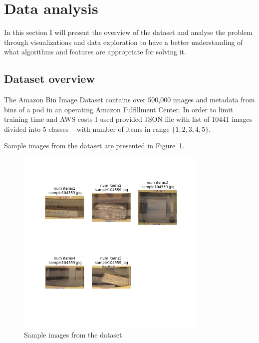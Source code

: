 \documentclass{article}
\begin{document}
\section{Data analysis}
In this section I will present the overview of the dataset and analyse the problem through visualizations and data exploration to have a better understanding of what algorithms and features are appropriate for solving it.

\subsection{Dataset overview}
The Amazon Bin Image Dataset contains over 500,000 images and metadata from bins of a pod in an operating Amazon Fulfillment Center. In order to limit training time and AWS costs I used provided JSON file with list of 10441 images divided into 5 classes -- with number of items in range $\{1,2,3,4,5\}$.

Sample images from the dataset are presented in Figure~\ref{fig:samples}.
\begin{figure}[ht]
	\centering
	\includegraphics[height=90mm]{../project/sample_dataset_images.png}
	\caption{Sample images from the dataset}
	\label{fig:samples}
\end{figure}
\end{document}
